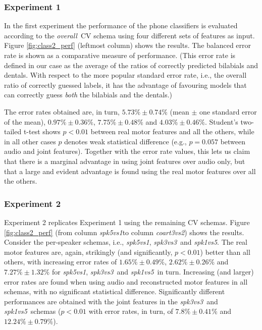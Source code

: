 \documentclass[10pt]{article}
\newcommand{\overall}{\emph{overall}}
\newcommand{\spka}{\emph{spk5vs1}}
\newcommand{\spkb}{\emph{spk3vs3}}
\newcommand{\spkc}{\emph{spk1vs5}}
\newcommand{\cob}{\emph{coart3vs2}}
\begin{document}
\subsubsection*{Experiment 1}
\label{subsec:exp1}

In the first experiment the performance of the phone classifiers is evaluated
according to the \overall\ CV schema using four different sets of features as
input. Figure \ref{fig:class2_perf} (leftmost column) shows the results. The balanced error rate
is shown as a comparative measure of performance. (This error rate is defined in
our case as the average of the ratios of correctly predicted bilabials and dentals.
With respect to the more popular standard error rate, i.e., the overall ratio of correctly
guessed labels, it has the advantage of favouring models that can correctly guess
\emph{both} the bilabials and the dentals.)

The error rates obtained are, in turn,
$5.73\% \pm 0.74\%$ (mean $\pm$ one standard error of the mean),
$0.97\% \pm 0.36\%$,
$7.75\% \pm 0.48\%$ and
$4.03\% \pm 0.46\%$. Student's two-tailed t-test shows $p<0.01$ between real motor features
and all the others, while in all other cases $p$ denotes weak statistical difference (e.g.,
$p=0.057$ between audio and joint features). Together with the error rate values, this lets
us claim that there is a marginal advantage in using joint features
over audio only, but that a large and evident advantage is found using the real motor features
over all the others.

\subsubsection*{Experiment 2}
\label{subsec:exp2}

Experiment 2 replicates Experiment 1 using the remaining CV schemas.
Figure \ref{fig:class2_perf} (from column \spka to column \cob) shows the results.
Consider the per-speaker schemas, i.e., \spka, \spkb\ and \spkc. The real motor
features are, again, strikingly (and significantly, $p<0.01$) better than all others,
with increasing error rates of
$1.65\% \pm 0.49\%$,
$2.62\% \pm 0.26\%$ and
$7.27\% \pm 1.32\%$ for \spka, \spkb\ and \spkc\ in turn. Increasing (and larger) error
rates are found when using audio and reconstructed motor features in all schemas, with
no significant statistical difference. Significantly different performances are obtained
with the joint features in the \spkb\ and \spkc\ schemas ($p<0.01$ with error rates, in turn,
of $7.8\% \pm 0.41\%$ and $12.24\% \pm 0.79\%$).
\end{document}
